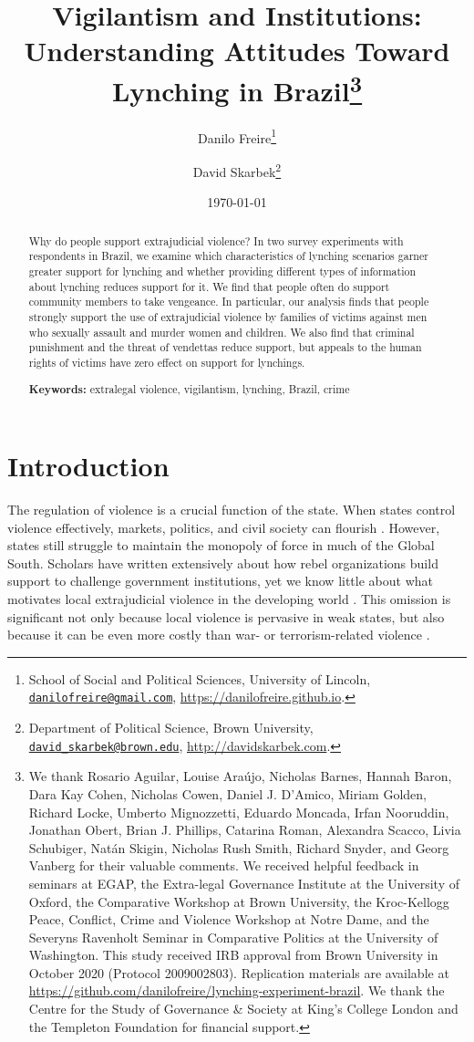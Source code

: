 \documentclass[12pt,a4paper]{article}
\title{Vigilantism and Institutions:\\ Understanding Attitudes Toward Lynching in Brazil\footnote{We thank Rosario Aguilar, Louise Araújo, Nicholas Barnes, Hannah Baron, Dara Kay Cohen, Nicholas Cowen, Daniel J. D'Amico, Miriam Golden, Richard Locke, Umberto Mignozzetti, Eduardo Moncada, Irfan Nooruddin, Jonathan Obert, Brian J. Phillips, Catarina Roman, Alexandra Scacco, Livia Schubiger, Natán Skigin, Nicholas Rush Smith, Richard Snyder, and Georg Vanberg for their valuable comments. We received helpful feedback in seminars at EGAP, the Extra-legal Governance Institute at the University of Oxford, the Comparative Workshop at Brown University, the Kroc-Kellogg Peace, Conflict, Crime and Violence Workshop at Notre Dame, and the Severyns Ravenholt Seminar in Comparative Politics at the University of Washington. This study received IRB approval from Brown University in October 2020 (Protocol 2009002803). Replication materials are available at \url{https://github.com/danilofreire/lynching-experiment-brazil}. We thank the Centre for the Study of Governance \& Society at King's College London and the Templeton Foundation for financial support.}}
\author{Danilo Freire\footnote{School of Social and Political Sciences, University of Lincoln, \href{mailto:danilofreire@gmail.com}{\texttt{danilofreire@gmail.com}}, \url{https://danilofreire.github.io}.} \and David Skarbek\footnote{Department of Political Science, Brown University, \href{mailto:david_skarbek@brown.edu}{\texttt{david\_skarbek@brown.edu}}, \url{http://davidskarbek.com}.}}
\date{\today}
\begin{document}
\maketitle

\begin{abstract}
\doublespacing \noindent Why do people support extrajudicial violence? In two survey experiments with respondents in Brazil, we examine which characteristics of lynching scenarios garner greater support for lynching and whether providing different types of information about lynching reduces support for it. We find that people often do support community members to take vengeance. In particular, our analysis finds that people strongly support the use of extrajudicial violence by families of victims against men who sexually assault and murder women and children. We also find that criminal punishment and the threat of vendettas reduce support, but appeals to the human rights of victims have zero effect on support for lynchings. 
\vspace{.25cm}

\noindent \textbf{Keywords:} extralegal violence, vigilantism, lynching, Brazil, crime 
\vspace{.25cm}

\end{abstract}

\newpage

\section{Introduction}
\label{sec:introduction}

\doublespacing

The regulation of violence is a crucial function of the state. When states
control violence effectively, markets, politics, and civil society can flourish
\citep{besley2011pillars, north2009violence}. However, states still struggle to
maintain the monopoly of force in much of the Global South. Scholars have
written extensively about how rebel organizations build support to challenge
government institutions, yet we know little about what motivates local
extrajudicial violence in the developing world \citep{bateson2020politics,
smith2000new}. This omission is significant not only because local violence is
pervasive in weak states, but also because it can be even more costly than war-
or terrorism-related violence \citep{blair2017predicting}. 
\end{document}
